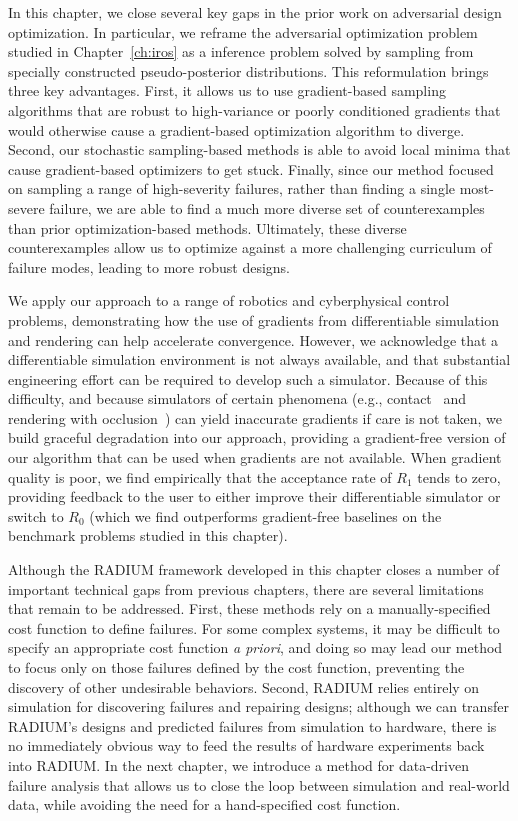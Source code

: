 In this chapter, we close several key gaps in the prior work on adversarial design optimization. In particular, we reframe the adversarial optimization problem studied in Chapter~\ref{ch:iros} as a inference problem solved by sampling from specially constructed pseudo-posterior distributions. This reformulation brings three key advantages. First, it allows us to use gradient-based sampling algorithms that are robust to high-variance or poorly conditioned gradients that would otherwise cause a gradient-based optimization algorithm to diverge. Second, our stochastic sampling-based methods is able to avoid local minima that cause gradient-based optimizers to get stuck. Finally, since our method focused on sampling a range of high-severity failures, rather than finding a single most-severe failure, we are able to find a much more diverse set of counterexamples than prior optimization-based methods. Ultimately, these diverse counterexamples allow us to optimize against a more challenging curriculum of failure modes, leading to more robust designs.

We apply our approach to a range of robotics and cyberphysical control problems, demonstrating how the use of gradients from differentiable simulation and rendering can help accelerate convergence. However, we acknowledge that a differentiable simulation environment is not always available, and that substantial engineering effort can be required to develop such a simulator. Because of this difficulty, and because simulators of certain phenomena (e.g., contact~\cite{huDiffTaichiDifferentiableProgramming2019} and rendering with occlusion~\cite{zhaoPhysicsbasedDifferentiableRendering2020}) can yield inaccurate gradients if care is not taken, we build graceful degradation into our approach, providing a gradient-free version of our algorithm that can be used when gradients are not available. When gradient quality is poor, we find empirically that the acceptance rate of $R_1$ tends to zero, providing feedback to the user to either improve their differentiable simulator or switch to $R_0$ (which we find outperforms gradient-free baselines on the benchmark problems studied in this chapter).

Although the RADIUM framework developed in this chapter closes a number of important technical gaps from previous chapters, there are several limitations that remain to be addressed. First, these methods rely on a manually-specified cost function to define failures. For some complex systems, it may be difficult to specify an appropriate cost function \textit{a priori}, and doing so may lead our method to focus only on those failures defined by the cost function, preventing the discovery of other undesirable behaviors. Second, RADIUM relies entirely on simulation for discovering failures and repairing designs; although we can transfer RADIUM's designs and predicted failures from simulation to hardware, there is no immediately obvious way to feed the results of hardware experiments back into RADIUM. In the next chapter, we introduce a method for data-driven failure analysis that allows us to close the loop between simulation and real-world data, while avoiding the need for a hand-specified cost function.
